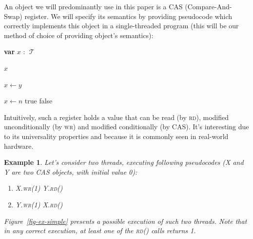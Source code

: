 \documentclass[a4paper,11pt]{article}
\def\T{\ensuremath{\operatorname{\mathcal{T}}}\text{ }}
\newtheorem{example}{Example}
\newcommand{\fn}[1]{\textsc{#1}}
\newcommand{\var}[2]{\textbf{var }#1 : #2}
\begin{document}
An object we will predominantly use in this paper is a CAS (Compare-And-Swap) register.
We will specify its semantics by providing pseudocode which correctly implements this object in
a single-threaded program (this will be our method of choice of providing object's semantics):

\begin{algorithmic}[1]
\State\var{$x$}{\T}
	
	\State\Return $x$
\EndFunction

	\State $x \gets y$
\EndFunction

	\State $x \gets n$
	\State\Return true
\Else
	\State\Return false
\EndIf
\EndFunction
\end{algorithmic}

Intuitively, such a register holds a value that can be read (by \fn{rd}), modified unconditionally (by \fn{wr})
and modified conditionally (by \fn{CAS}). It's interesting due to its universality properties\cite{cas-univ} %
and because it is
commonly seen in real-world hardware. %

\begin{example}\label{ex-simple}
Let's consider two threads, executing following pseudocodes (X and Y are two CAS objects, with initial value 0):

\begin{enumerate}
\item\begin{algorithmic}[1]
\State X.\fn{wr}(1)
\State Y.\fn{rd}()
\end{algorithmic}

\item\begin{algorithmic}[1]
\State Y.\fn{wr}(1)
\State X.\fn{rd}()
\end{algorithmic}
\end{enumerate}

Figure~\ref{fig-ex-simple} presents a possible execution of such two threads. Note that in any correct execution,
at least one of the \fn{rd}() calls returns 1.
\end{example}
\end{document}
